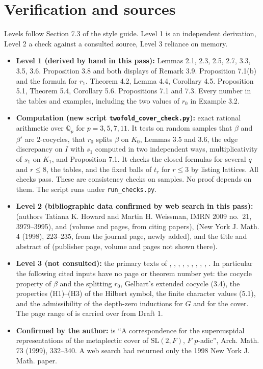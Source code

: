 \documentclass[12pt,letterpaper]{article}
\begin{document}
\section{Verification and sources}\label{sec:verif}
Levels follow Section 7.3 of the style guide. Level 1 is an independent derivation, Level 2 a check against a consulted source, Level 3 reliance on memory.
\begin{itemize}
\item \textbf{Level 1 (derived by hand in this pass):} Lemmas 2.1, 2.3, 2.5, 2.7, 3.3, 3.5, 3.6. Proposition 3.8 and both displays of Remark 3.9. Proposition 7.1(b) and the formula for $r_1$. Theorem 4.2, Lemma 4.4, Corollary 4.5. Proposition 5.1, Theorem 5.4, Corollary 5.6. Propositions 7.1 and 7.3. Every number in the tables and examples, including the two values of $r_0$ in Example 3.2.
\item \textbf{Computation (new script \texttt{twofold\_cover\_check.py}):} exact rational arithmetic over $\mathbb Q_p$ for $p=3,5,7,11$. It tests on random samples that $\beta$ and $\beta'$ are $2$-cocycles, that $r_0$ splits $\beta$ on $K_0$, Lemmas 3.5 and 3.6, the edge discrepancy on $I$ with $s_1$ computed in two independent ways, multiplicativity of $s_1$ on $K_1$, and Proposition 7.1. It checks the closed formulas for several $q$ and $r\le8$, the tables, and the fixed balls of $t_r$ for $r\le3$ by listing lattices. All checks pass. These are consistency checks on samples. No proof depends on them. The script runs under \texttt{run\_checks.py}.
\item \textbf{Level 2 (bibliographic data confirmed by web search in this pass):} \cite{HW09} (authors Tatiana K. Howard and Martin H. Weissman, IMRN 2009 no.~21, 3979--3995), \cite{MP94} and \cite{DL76} (volume and pages, from citing papers), \cite{Jo98} (New York J. Math. 4 (1998), 223--235, from the journal page, newly added), and the title and abstract of \cite{Ma04} (publisher page, volume and pages not shown there).
\item \textbf{Level 3 (not consulted):} the primary texts of \cite{Ku67}, \cite{Ge76}, \cite{Ne86}, \cite{Bo11}, \cite{Ku87}, \cite{Li12}, \cite{Ma84a}, \cite{Ma84b}, \cite{SS68}, \cite{Wa91}. In particular the following cited inputs have no page or theorem number yet: the cocycle property of $\beta$ and the splitting $r_0$, Gelbart's extended cocycle (3.4), the properties (H1)--(H3) of the Hilbert symbol, the finite character values (5.1), and the admissibility of the depth-zero inductions for $G$ and for the cover. The page range of \cite{Ku87} is carried over from Draft 1.
\item \textbf{Confirmed by the author:} \cite{Jo99} is ``A correspondence for the supercuspidal representations of the metaplectic cover of $\mathrm{SL}(2,F)$, $F$ $p$-adic'', Arch. Math. 73 (1999), 332--340. A web search had returned only the 1998 New York J. Math. paper.
\end{itemize}
\end{document}
